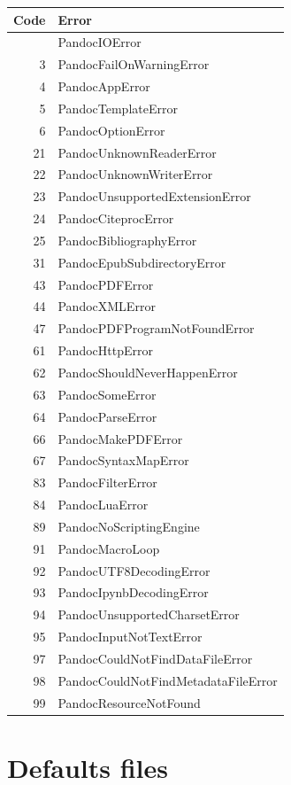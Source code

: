 \documentclass[
]{article}
\begin{document}
\begin{longtable}[]{@{}rl@{}}
\toprule\noalign{}
Code & Error \\
\midrule\noalign{}
\endhead
\bottomrule\noalign{}
\endlastfoot
1 & PandocIOError \\
3 & PandocFailOnWarningError \\
4 & PandocAppError \\
5 & PandocTemplateError \\
6 & PandocOptionError \\
21 & PandocUnknownReaderError \\
22 & PandocUnknownWriterError \\
23 & PandocUnsupportedExtensionError \\
24 & PandocCiteprocError \\
25 & PandocBibliographyError \\
31 & PandocEpubSubdirectoryError \\
43 & PandocPDFError \\
44 & PandocXMLError \\
47 & PandocPDFProgramNotFoundError \\
61 & PandocHttpError \\
62 & PandocShouldNeverHappenError \\
63 & PandocSomeError \\
64 & PandocParseError \\
66 & PandocMakePDFError \\
67 & PandocSyntaxMapError \\
83 & PandocFilterError \\
84 & PandocLuaError \\
89 & PandocNoScriptingEngine \\
91 & PandocMacroLoop \\
92 & PandocUTF8DecodingError \\
93 & PandocIpynbDecodingError \\
94 & PandocUnsupportedCharsetError \\
95 & PandocInputNotTextError \\
97 & PandocCouldNotFindDataFileError \\
98 & PandocCouldNotFindMetadataFileError \\
99 & PandocResourceNotFound \\
\end{longtable}

\hypertarget{defaults-files}{%
\section{Defaults files}\label{defaults-files}}
\end{document}
